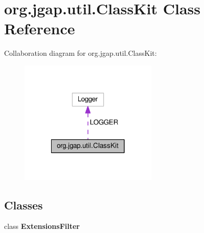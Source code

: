 \hypertarget{classorg_1_1jgap_1_1util_1_1_class_kit}{\section{org.\-jgap.\-util.\-Class\-Kit Class Reference}
\label{classorg_1_1jgap_1_1util_1_1_class_kit}
}


Collaboration diagram for org.\-jgap.\-util.\-Class\-Kit\-:
\nopagebreak
\begin{figure}[H]
\begin{center}
\leavevmode
\includegraphics[width=186pt]{classorg_1_1jgap_1_1util_1_1_class_kit__coll__graph}
\end{center}
\end{figure}
\subsection*{Classes}
\begin{DoxyCompactItemize}
\item 
class {\bfseries Extensions\-Filter}
\end{DoxyCompactItemize}

